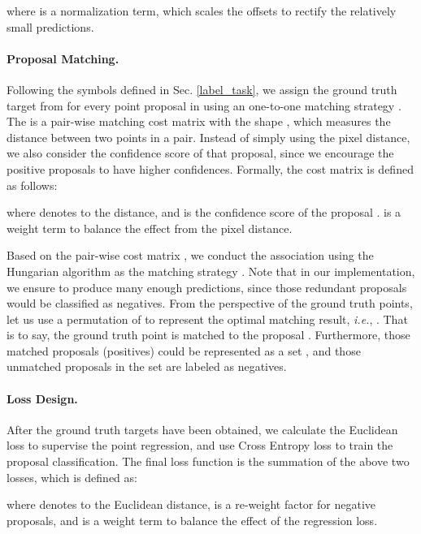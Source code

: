 \documentclass[10pt,twocolumn,letterpaper]{article}
\begin{document}
where  is a normalization term, which scales the offsets to rectify the relatively small predictions.
\vspace{-0.8em}
\paragraph{Proposal Matching.} Following the symbols defined in Sec. \ref{label_task}, we assign the ground truth target from  for every point proposal in  using an one-to-one matching strategy . The  is a pair-wise matching cost matrix with the shape , which measures the distance between two points in a pair. Instead of simply using the pixel distance, we also consider the confidence score of that proposal, since we encourage the positive proposals to have higher confidences. Formally, the cost matrix  is defined as follows:
 
where  denotes to the  distance, and  is the confidence score of the proposal .  is a weight term to balance the effect from the pixel distance.

Based on the pair-wise cost matrix , we conduct the association using the Hungarian algorithm \cite{kuhn1955hungarian,e2e2016,s2s2019} as the matching strategy . Note that in our implementation, we ensure  to produce many enough predictions, since those redundant proposals would be classified as negatives. From the perspective of the ground truth points, let us use a permutation  of  to represent the optimal matching result, \textit{i.e.}, . That is to say, the ground truth point  is matched to the proposal . Furthermore, those matched proposals (positives) could be represented as a set , and those unmatched proposals in the set  are labeled as negatives.
\vspace{-0.8em}
\paragraph{Loss Design.} After the ground truth targets have been obtained, we calculate the Euclidean loss  to supervise the point regression, and use Cross Entropy loss  to train the proposal classification. The final loss function  is the summation of the above two losses, which is defined as:


 
where  denotes to the Euclidean distance,  is a re-weight factor for negative proposals, and  is a weight term to balance the effect of the regression loss.
\vspace{-0.8em}
\end{document}
